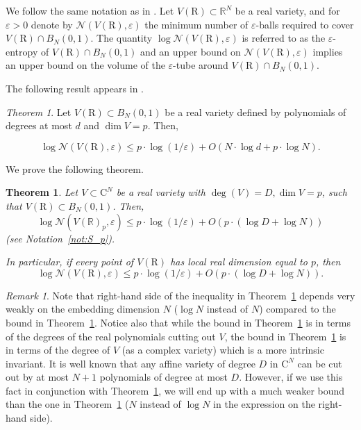 \documentclass[10pt]{amsart}
\newtheorem{theorem}{Theorem}
\theoremstyle{definition}
\theoremstyle{remark}
\newtheorem{remark}{Remark}
\newtheorem{thmx}{Theorem}
\numberwithin{equation}{section}
\newcommand {\R} {\mathrm{R}}
\newcommand {\C}     {\mathrm{C}}
\newcommand {\eps} {{\varepsilon}}
\begin{document}
We follow the same notation as in \cite{Zhang-Kileel2023}. Let $V(\R)  \subset \mathbb{R}^N$ be a real variety, and for $\eps >0$ denote by $\mathcal{N}(V(\R),\eps)$ the minimum number of $\eps$-balls required to cover $V(\R) \cap B_N(0,1)$. The quantity $\log \mathcal{N}(V(\R),\eps)$ is referred to as the $\eps$-entropy of  $V(\R) \cap B_N(0,1)$ and an upper bound on $\mathcal{N}(V(\R),\eps)$ implies an upper bound on the volume of the 
$\eps$-tube around $V(\R) \cap B_N(0,1)$.

The following result appears in \cite[page 4, Table 1, entry on real varieties]{Zhang-Kileel2023}.

\begin{thmx}
\label{thmx:ZK}
Let $V(\R) \subset B_N(0,1)$ be a real variety defined by polynomials of degrees at most $d$ and $\dim V = p$. Then,

\begin{equation}
 \log \mathcal{N}(V(\R),\eps) \leq p \cdot \log(1/\eps) + O(N \cdot\log d + p\cdot\log N).
\end{equation}
\end{thmx}

We prove the following theorem.
\begin{theorem}
\label{thm:entropy}
Let $V \subset \C^N$ be a real variety with $\deg(V) = D, \dim V = p$, such that $V(\R) \subset B_N(0,1)$. 
Then,
\[
   \log \mathcal{N}(V(\mathbb{R})_p,\eps) \leq p \cdot \log(1/\eps) + O(p \cdot  (\log D + \log N))
  \]
(see Notation~\ref{not:S_p}).

In particular, if every point of $V(\R)$ has local real dimension equal to $p$, then
\[
\log \mathcal{N}(V(\R),\eps) \leq p \cdot \log(1/\eps) + O(p \cdot  (\log D + \log N)).
\]
\end{theorem}

\begin{remark}
\label{rem:entropy1}
   Note that right-hand side of the inequality in Theorem~\ref{thm:entropy} depends very weakly on the embedding dimension $N$ ($\log N$ instead of $N$) compared to 
the bound in Theorem~\ref{thmx:ZK}. Notice also that while the bound in
Theorem~\ref{thmx:ZK} is in terms of the degrees of the real 
polynomials cutting out 
$V$, the bound in Theorem~\ref{thm:entropy} is in terms of the degree of $V$ (as a complex variety) which is a more intrinsic invariant. It is well known that any affine variety of degree $D$ in $\C^N$ can be cut out by at most 
$N+1$ polynomials of degree at most $D$. However, if we use this fact in conjunction with Theorem~\ref{thmx:ZK}, we will end up with a much weaker bound than the one in Theorem~\ref{thm:entropy} ($N$ instead of $\log N$ in the expression on the right-hand side). 
\end{remark}
\end{document}
